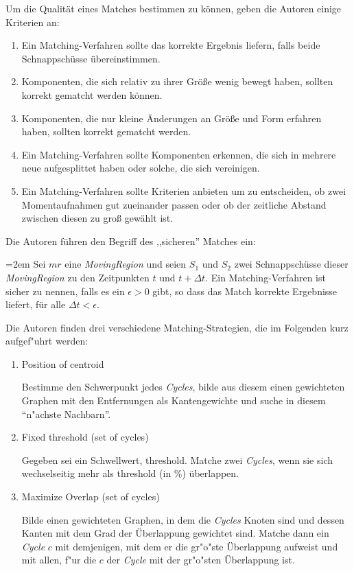 Um die Qualität eines Matches bestimmen zu können, geben die Autoren einige Kriterien an:

\begin{enumerate}
\item Ein Matching-Verfahren sollte das korrekte Ergebnis liefern, falls beide Schnappschüsse übereinstimmen.
\item Komponenten, die sich relativ zu ihrer Größe wenig bewegt haben, sollten korrekt gematcht werden können.
\item Komponenten, die nur kleine Änderungen an Größe und Form erfahren haben, sollten korrekt gematcht werden.
\item Ein Matching-Verfahren sollte Komponenten erkennen, die sich in mehrere neue aufgesplittet haben oder solche, die sich vereinigen.
\item Ein Matching-Verfahren sollte Kriterien anbieten um zu entscheiden, ob zwei Momentaufnahmen gut zueinander passen oder ob der zeitliche Abstand zwischen diesen zu groß gewählt ist.
\end{enumerate}

Die Autoren führen den Begriff des ,,sicheren'' Matches ein:

\par
\begingroup
\leftskip=2em 
Sei $mr$ eine \textit{MovingRegion} und seien $S_1$ und $S_2$ zwei Schnappschüsse dieser \textit{MovingRegion} zu den Zeitpunkten $t$ und $t+\Delta t$. Ein Matching-Verfahren ist sicher zu nennen, falls es ein $\epsilon >0$ gibt, so dass das Match korrekte Ergebnisse liefert, für alle $\Delta t < \epsilon$.
\par
\endgroup

Die Autoren finden drei verschiedene Matching-Strategien, die im Folgenden kurz aufgef"uhrt werden:
\begin{enumerate}
\item Position of centroid \label{MatchSchwer}

Bestimme den Schwerpunkt jedes \textit{Cycles},  bilde aus diesem einen gewichteten Graphen mit den Entfernungen als Kantengewichte und suche in diesem "`n"achste Nachbarn"'.
\item Fixed threshold (set of cycles)\label{fixedThre}

Gegeben sei ein Schwellwert, threshold. Matche zwei \textit{Cycles}, wenn sie sich wechselseitig  mehr als threshold (in \%) überlappen.

\item Maximize Overlap (set of cycles)

Bilde einen gewichteten Graphen, in dem die \textit{Cycles} Knoten sind und dessen Kanten mit dem Grad der Überlappung gewichtet sind. Matche dann ein \textit{Cycle} $c$ mit demjenigen, mit dem er die gr"o"ste Überlappung aufweist und mit allen, f"ur die $c$ der \textit{Cycle} mit der gr"o"sten Überlappung ist.
\end{enumerate} 

